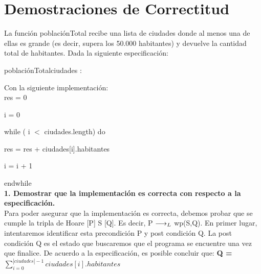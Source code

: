 \documentclass[10pt,a4paper]{article}
\begin{document}

\section{Demostraciones de Correctitud}



La función poblaciónTotal recibe una lista de ciudades donde al menos una de ellas es grande (es decir, supera los 50.000 habitantes) y devuelve la cantidad total de habitantes. Dada la siguiente especificación:

\begin{proc}{poblaciónTotal}{\In ciudades : \TLista{\str\times\ent}}{\ent}
\end{proc}
Con la siguiente implementación:\\

    res = 0
    
    i = 0
    
    while ( i $<$ ciudades.length) do
    
    \hspace{0.7cm}res = res + ciudades[i].habitantes
    
    \hspace{0.7cm}i = i + 1
    
    endwhile\\

\textbf{1. Demostrar que la implementación es correcta con respecto a la especificación.}\\

Para poder asegurar que la implementación es correcta, debemos probar que se cumple la tripla de Hoare [P] S [Q]. Es decir, P $\longrightarrow _L$ wp(S,Q). En primer lugar, intentaremos identificar esta precondición P y post condición Q.
La post condición Q es el estado que buscaremos que el programa se encuentre una vez que finalice. De acuerdo a la especificación, es posible concluir que:
\textbf{{Q = ${\sum\limits_{i=0}^{|ciudades| - 1}ciudades[i].habitantes}$}}
\end{document}
